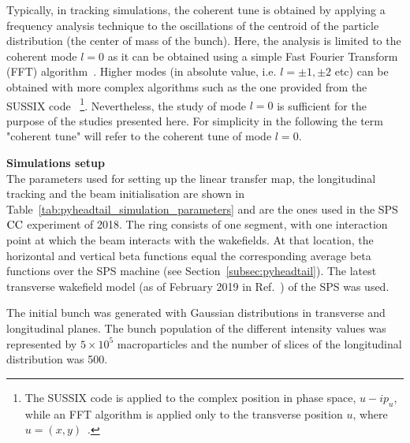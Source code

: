 Typically, in tracking simulations, the coherent tune is obtained by applying a frequency analysis technique to the oscillations of the centroid of the particle distribution (the center of mass of the bunch). Here, the analysis is limited to the coherent mode $l=0$ as it can be obtained using a simple Fast Fourier Transform (FFT) algorithm~\cite{FFT_and_applications}. Higher modes (in absolute value, i.e. $l=\pm 1, \pm 2$ etc) can be obtained with more complex algorithms such as the one provided from the SUSSIX code~\cite{Bartolini:702438} \footnote{The SUSSIX code is applied to the complex position in phase space, $u-i p_u$, while an FFT algorithm is applied only to the transverse position $u$, where $u=(x,y)$~\cite{Salvant:1274254}.}. Nevertheless, the study of mode $l=0$ is sufficient for the purpose of the studies presented here. For simplicity in the following the term "coherent tune" will refer to the coherent tune of mode $l=0$.

\textbf{Simulations setup}\\
The parameters used for setting up the linear transfer map, the longitudinal tracking and the beam initialisation are shown in Table~\ref{tab:pyheadtail_simulation_parameters} and are the ones used in the SPS ${\mathrm{CC}}$ experiment of 2018. The ring consists of one segment, with one interaction point at which the beam interacts with the wakefields. At that location, the horizontal and vertical beta functions equal the corresponding average beta functions over the SPS machine (see Section~\ref{subsec:pyheadtail}). The latest transverse wakefield model (as of February 2019 in Ref.~\cite{sps_impedance_model_git}) of the SPS was used.

The initial bunch was generated with Gaussian distributions in transverse and longitudinal planes. The bunch population of the different intensity values was represented by $5 \times 10^5$ macroparticles and the number of slices of the longitudinal distribution was 500.

